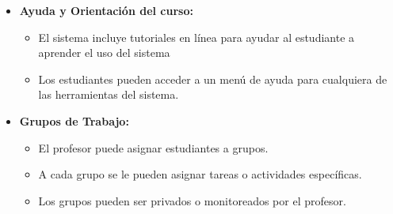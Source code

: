 	\begin{itemize}
		\item \textbf{Ayuda y Orientación del curso:}
			\begin{itemize}
				\item El sistema incluye tutoriales en línea para ayudar al estudiante a aprender el uso del sistema
				\item Los estudiantes pueden acceder a un menú de ayuda para cualquiera de las herramientas del sistema.
			\end{itemize}
	\end{itemize}
	\begin{itemize}
		\item \textbf{Grupos de Trabajo:}
			\begin{itemize}
				\item El profesor puede asignar estudiantes a grupos.
				\item A cada grupo se le pueden asignar tareas o actividades específicas.
				\item Los grupos pueden ser privados o monitoreados por el profesor.
			\end{itemize}
	\end{itemize}
